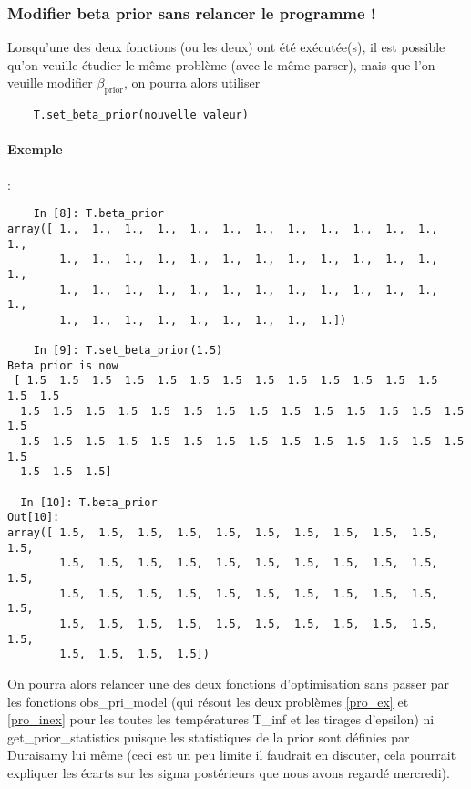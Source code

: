 \documentclass[a4paper,12pt]{article}
\newcommand\bk{\color{black}}
\newcommand\navy{\color{navy}}
\newcommand{\dgreen}{\color{dgreen}}
\numberwithin{equation}{section} %
\begin{document}
\navy \subsubsection*{Modifier beta prior sans relancer le programme !} \bk
Lorsqu'une des deux fonctions (ou les deux) ont été exécutée(s), il est possible qu'on veuille étudier le même problème (avec le même parser), mais que l'on veuille modifier $\beta_{\text{prior}}$, on pourra alors utiliser \begin{lstlisting}
	T.set_beta_prior(nouvelle valeur)
\end{lstlisting}
\dgreen \paragraph*{Exemple} : \bk
\begin{lstlisting}
	In [8]: T.beta_prior
array([ 1.,  1.,  1.,  1.,  1.,  1.,  1.,  1.,  1.,  1.,  1.,  1.,  1.,
        1.,  1.,  1.,  1.,  1.,  1.,  1.,  1.,  1.,  1.,  1.,  1.,  1.,
        1.,  1.,  1.,  1.,  1.,  1.,  1.,  1.,  1.,  1.,  1.,  1.,  1.,
        1.,  1.,  1.,  1.,  1.,  1.,  1.,  1.,  1.])

    In [9]: T.set_beta_prior(1.5)
Beta prior is now 
 [ 1.5  1.5  1.5  1.5  1.5  1.5  1.5  1.5  1.5  1.5  1.5  1.5  1.5  1.5  1.5
  1.5  1.5  1.5  1.5  1.5  1.5  1.5  1.5  1.5  1.5  1.5  1.5  1.5  1.5  1.5
  1.5  1.5  1.5  1.5  1.5  1.5  1.5  1.5  1.5  1.5  1.5  1.5  1.5  1.5  1.5
  1.5  1.5  1.5]

  In [10]: T.beta_prior
Out[10]: 
array([ 1.5,  1.5,  1.5,  1.5,  1.5,  1.5,  1.5,  1.5,  1.5,  1.5,  1.5,
        1.5,  1.5,  1.5,  1.5,  1.5,  1.5,  1.5,  1.5,  1.5,  1.5,  1.5,
        1.5,  1.5,  1.5,  1.5,  1.5,  1.5,  1.5,  1.5,  1.5,  1.5,  1.5,
        1.5,  1.5,  1.5,  1.5,  1.5,  1.5,  1.5,  1.5,  1.5,  1.5,  1.5,
        1.5,  1.5,  1.5,  1.5])

\end{lstlisting}
On pourra alors relancer une des deux fonctions d'optimisation sans passer par les fonctions obs\_pri\_model (qui résout les deux problèmes \eqref{pro_ex} et \eqref{pro_inex} pour les toutes les températures T\_inf et les tirages d'epsilon) ni get\_prior\_statistics puisque les statistiques de la prior sont définies par Duraisamy lui même (ceci est un peu limite il faudrait en discuter, cela pourrait expliquer les écarts sur les sigma postérieurs que nous avons regardé mercredi).
\end{document}
